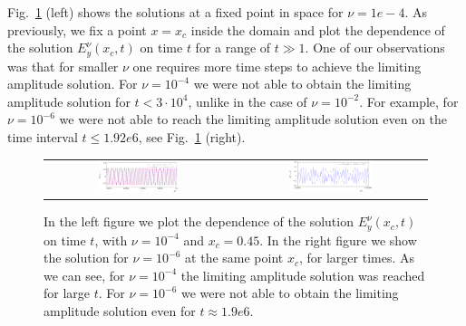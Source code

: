 \FloatBarrier
Fig.~\ref{fig:nu1e4_harmon} (left) shows the solutions at a fixed point in space for $\nu=1e-4$. As previously, 
 we fix a point $x=x_c$ inside the domain and plot 
the dependence of the solution $E_{y}^{\nu}(x_c,t)$ on time $t$ for a range of $t\gg 1$. 
One of our observations was that for smaller $\nu$ one requires more time steps to achieve the limiting amplitude solution. 
For $\nu=10^{-4}$ we were not able to obtain the limiting amplitude solution for $t<3\cdot 10^{4}$, unlike in the case of $\nu=10^{-2}$. 
For example, for $\nu=10^{-6}$ we were not able to reach the limiting amplitude solution even on the time interval $t\leq 1.92e6$, 
see Fig.~\ref{fig:nu1e4_harmon} (right). 
\begin{figure}
\begin{tabular}{cc}
 \includegraphics[width=0.45\textwidth]{pics_time_domain/airy/figure_nu1e4-crop.pdf}&
 \includegraphics[width=0.45\textwidth]{pics_time_domain/airy/figure_nu1e6-crop.pdf}\\
\end{tabular}
\caption{In the left figure we plot the dependence of the solution $E_{y}^{\nu}(x_c,t)$  on time $t$, with $\nu=10^{-4}$ and $x_c=0.45$. 
In the right figure we show the solution  for $\nu=10^{-6}$ at the same point $x_c$, for larger times. As we can see, for 
$\nu=10^{-4}$ the limiting amplitude solution was reached for large $t$. For $\nu=10^{-6}$ we were not able 
to obtain the limiting amplitude solution even for $t\approx 1.9e6$. }
  \label{fig:nu1e4_harmon}
\end{figure}

